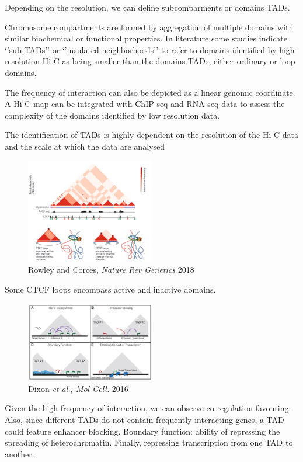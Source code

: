 Depending on the resolution, we can define subcomparments or domains TADs.

Chromosome compartments are formed by aggregation of multiple domains with similar biochemical or functional properties. In literature some studies indicate `'sub-TADs'' or `'insulated neighborhoods'' to refer to domains identified by high-resolution Hi-C as being smaller than the domains TADs, either ordinary or loop domains.

The frequency of interaction can also be depicted as a linear genomic coordinate. A Hi-C map can be integrated with ChIP-seq and RNA-seq data to assess the complexity of the domains identified by low resolution data.

The identification of TADs is highly dependent on the resolution of the Hi-C data and the scale at which the data are analysed

\begin{figure}
\centering
\includegraphics[width=0.5\textwidth]{../_resources/Screenshot_2022-10-19_at_09-20-57.png}
\caption{Rowley and Corces, \emph{Nature Rev Genetics} 2018}
\end{figure}

Some CTCF loops encompass active and inactive domains.

\begin{figure}
\centering
\includegraphics[width=0.5\textwidth]{../_resources/Screenshot_2022-10-19_at_09-21-57.png}
\caption{Dixon \emph{et al., Mol Cell.} 2016}
\end{figure}

Given the high frequency of interaction, we can observe co-regulation favouring. Also, since different TADs do not contain frequently interacting genes, a TAD could feature enhancer blocking. Boundary function: ability of repressing the spreading of heterochromatin. Finally, repressing transcription from one TAD to another.

